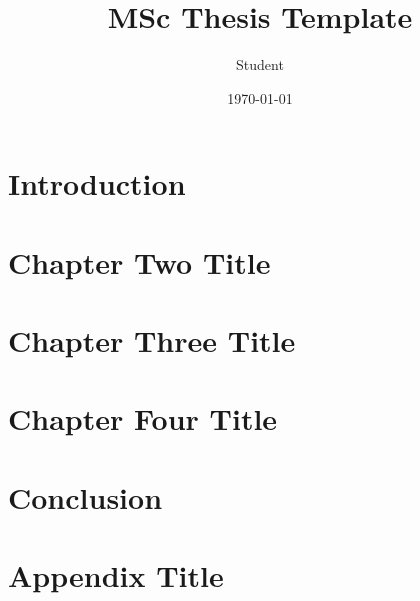 \documentclass[11pt,twoside]{report}
\title{MSc Thesis Template}
\author{Student }
\date{\today}
\begin{document}





\tableofcontents


\clearpage{} 


\chapter{Introduction}


\chapter{Chapter Two Title}


\chapter{Chapter Three Title}


\chapter{Chapter Four Title}


\chapter{Conclusion}


\appendix   %
\chapter{Appendix Title}


{}
%
\end{document}
